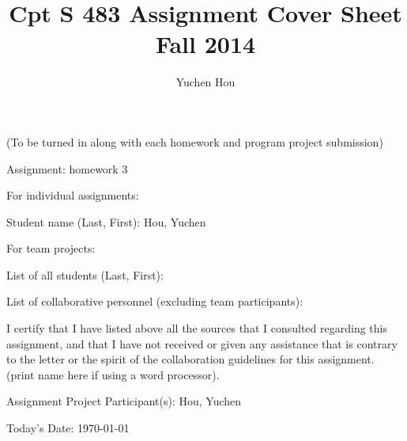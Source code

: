 \documentclass[12pt]{article}
\begin{document}
\title{Cpt S 483 Assignment Cover Sheet \\ Fall 2014}
\author{Yuchen Hou}
\maketitle

(To be turned in along with each homework and program project submission)

Assignment: homework 3

For individual assignments:

Student name (Last, First): Hou, Yuchen

For team projects:

List of all students (Last, First):

List of collaborative personnel (excluding team participants):

I certify that I have listed above all the sources that I consulted regarding this assignment, and that I have not received or given any assistance that is contrary to the letter or the spirit of the collaboration guidelines for this assignment. (print name here if using a word processor).

Assignment Project Participant(s): Hou, Yuchen

Today's Date: \today
\end{document}
